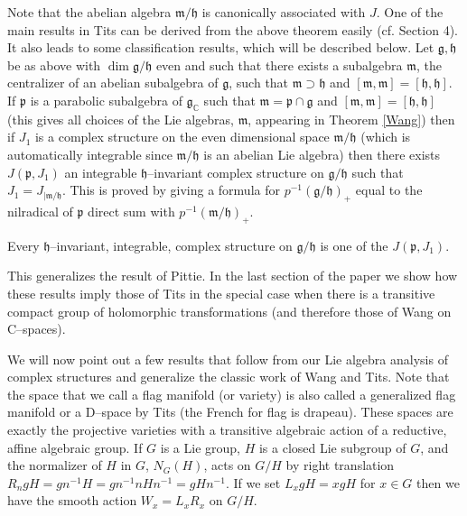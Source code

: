 \documentclass{amse-new}
\numberwithin{equation}{section} %
\begin{document}
Note that the abelian algebra  $\mathfrak{m}/\mathfrak{h}$ is canonically associated with $J$.
One of the main results in Tits \cite{Tits} can be derived from the above theorem
easily (cf. Section 4). It also leads to some classification results, which
will be described below. Let $\mathfrak{g},\mathfrak{h}$ be as above with
$\dim\mathfrak{g}/\mathfrak{h}$ even and such that there exists a subalgebra
$\mathfrak{m}$, the centralizer of an abelian subalgebra of $\mathfrak{g}$,
such that $\mathfrak{m}\supset\mathfrak{h}$ and $[\mathfrak{m},\mathfrak{m}%
]=[\mathfrak{h},\mathfrak{h}]$. If $\mathfrak{p}$ is a parabolic subalgebra of
$\mathfrak{g}_{\mathbb{C}}$ such that $\mathfrak{m}=\mathfrak{p}%
\cap\mathfrak{g}$ and $[\mathfrak{m},\mathfrak{m}]=[\mathfrak{h}%
,\mathfrak{h}]$ (this gives all choices of the Lie algebras, $\mathfrak{m}$,
appearing in Theorem \ref{Wang}) then if $J_{1}$ is a complex structure on
the even dimensional space $\mathfrak{m}/\mathfrak{h}$ (which is automatically
integrable since $\mathfrak{m}/\mathfrak{h}$ is an abelian Lie algebra) then
there exists $J(\mathfrak{p},J_{1})$ an integrable $\mathfrak{h}$--invariant
complex structure on $\mathfrak{g}/\mathfrak{h}$ such that $J_{1}%
=J_{|\mathfrak{m/\mathfrak{h}}}$. This is proved by giving a formula for
$p^{-1}\left(  \mathfrak{g}/\mathfrak{h}\right)_{+}$ equal to the nilradical
of $\mathfrak{p}$ direct sum with $p^{-1}\left(  \mathfrak{m}/\mathfrak{h}%
\right)  _{+}$.

\begin{theorem}
\label{thm:main3-moduli} Every $\mathfrak{h}$--invariant, integrable, complex
structure on $\mathfrak{g}/\mathfrak{h}$ is one of the $J(\mathfrak{p},
J_{1})$.
\end{theorem}

This generalizes the result of Pittie. In the last section of the paper we
show how these results imply those of Tits in the special case when there is a
transitive compact group of holomorphic transformations (and therefore those
of Wang on C--spaces).

We will now point out a few results that follow from our Lie algebra analysis
of complex structures and generalize the classic work of Wang and Tits. Note
that the space that we call a flag manifold (or variety) is also called a
generalized flag manifold or a D--space by Tits (the French  for flag is
drapeau). These spaces are exactly the projective varieties with a transitive
algebraic action of a reductive, affine algebraic group. If $G$ is a Lie
group, $H$ is a closed Lie subgroup of $G$, and the normalizer of $H$ in $G$,
$N_{G}(H)$, acts on $G/H$ by right translation $R_{n}gH=gn^{-1}H=gn^{-1}%
nHn^{-1}=gHn^{-1}$. If we set $L_{x}gH=xgH$ for $x\in G$ then we have the
smooth action $W_{x}=L_{x}R_{x}$ on $G/H$.
\end{document}
